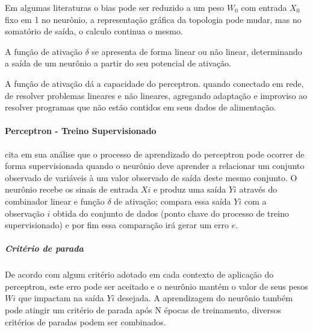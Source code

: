 \documentclass[	12pt, Times, openright, twoside, a4paper, english, brazil]{abntex2}
\begin{document}
		     Em algumas literaturas o bias pode ser reduzido a um peso $W_0$ com entrada $X_0$ fixo em 1 no neurônio, a representação gráfica da topologia pode mudar, mas no somatório de saída, o calculo continua o mesmo.
		
		     A função de ativação $\delta$ se apresenta de forma linear ou não linear, determinando a saída de um neurônio a partir do seu potencial de ativação. 
		
		     \begin{figure}[H]
		     \end{figure}
		
		     A função de ativação dá a capacidade do perceptron. quando conectado em rede, de resolver problemas lineares e não lineares, agregando adaptação e improviso ao resolver programas que não estão contidos em seus dados de alimentação.
			
		  \paragraph*{Perceptron - Treino Supervisionado}
            \cite{Almeida2013} cita em sua análise que o processo de aprendizado do perceptron pode ocorrer de forma supervisionada quando o neurônio deve aprender a relacionar um conjunto observado de variáveis à um valor observado de saída deste mesmo conjunto. O neurônio recebe os sinais de entrada $Xi$ e produz uma saída $Yi$ através do combinador linear e função $\delta$ de ativação; compara essa saída $Yi$ com a observação $i$ obtida do conjunto de dados (ponto chave do processo de treino supervisionado) e por fim essa comparação irá gerar um erro $e$.
            
            \subparagraph*{Critério de parada}
            	De acordo com algum critério adotado em cada contexto de aplicação do perceptron, este erro pode ser aceitado e o neurônio mantém o valor de seus pesos $Wi$ que impactam na saída $Yi$ desejada. A aprendizagem do neurônio também pode atingir um critério de parada após N épocas de treinamento, diversos critérios de paradas  podem ser combinados.  
            	
\end{document}
